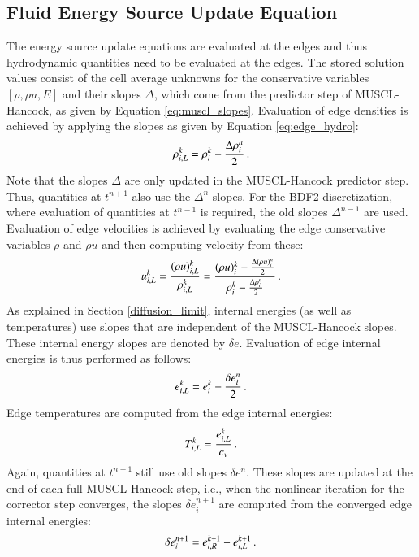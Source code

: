 \subsection{Fluid Energy Source Update Equation}
The energy source update equations are evaluated at the edges and thus hydrodynamic
quantities need to be evaluated at the edges. The stored solution values
consist of the cell average unknowns for the conservative variables $[\rho,\rho u,E]$
and their slopes $\Delta$, which come from the predictor step of MUSCL-Hancock,
as given by Equation \eqref{eq:muscl_slopes}. Evaluation of edge densities is achieved
by applying the slopes as given by Equation \eqref{eq:edge_hydro}:
\begin{equation}
   \rho_{i,L}^k = \rho_i^k - \frac{\Delta\rho_i^n}{2} \, .
\end{equation}
Note that the slopes $\Delta$ are only updated in the MUSCL-Hancock predictor
step. Thus, quantities at $t^{n+1}$ also use the $\Delta^n$ slopes. For the
BDF2 discretization, where evaluation of quantities at $t^{n-1}$ is required,
the old slopes $\Delta^{n-1}$ are used. Evaluation of edge velocities is
achieved by evaluating the edge conservative variables $\rho$ and $\rho u$
and then computing velocity from these:
\begin{equation}
   u_{i,L}^k = \frac{(\rho u)_{i,L}^k}{\rho_{i,L}^k}
          = \frac{(\rho u)_i^k - \frac{\Delta(\rho u)_i^n}{2}}
                 {\rho_i^k - \frac{\Delta\rho_i^n}{2}} \, .
\end{equation}
As explained in Section \ref{diffusion_limit}, internal energies (as well
as temperatures) use slopes that are independent of the MUSCL-Hancock slopes.
These internal energy slopes are denoted by $\delta e$. Evaluation
of edge internal energies is thus performed as follows:
\begin{equation}
   e_{i,L}^k = e_i^k - \frac{\delta e_i^n}{2} \, .
\end{equation}
Edge temperatures are computed from the edge internal energies:
\begin{equation}
   T_{i,L}^k = \frac{e_{i,L}^k}{c_v} \, .
\end{equation}
Again, quantities at $t^{n+1}$ still use old slopes $\delta e^n$. These
slopes are updated at the end of each full MUSCL-Hancock step, i.e.,
when the nonlinear iteration for the corrector step converges, the
slopes $\delta e_i^{n+1}$ are computed from the converged edge internal energies:
\begin{equation}
   \delta e_i^{n+1} = e_{i,R}^{k+1} - e_{i,L}^{k+1} \, .
\end{equation}


